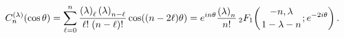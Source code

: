 \[\mathop{C^{(\lambda)}_{n}\/}\nolimits\!\left(\mathop{\cos\/}\nolimits\theta%
\right)=\sum_{\ell=0}^{n}\frac{\left(\lambda\right)_{\ell}\left(\lambda\right)%
_{n-\ell}}{\ell!\;(n-\ell)!}\mathop{\cos\/}\nolimits\!\left((n-2\ell)\theta%
\right)=e^{in\theta}\frac{\left(\lambda\right)_{n}}{n!}\mathop{{{}_{2}F_{1}}\/%
}\nolimits\!\left({-n,\lambda\atop 1-\lambda-n};e^{-2i\theta}\right).\]